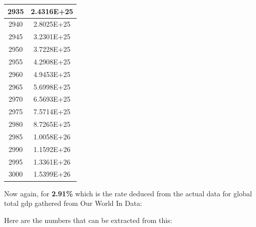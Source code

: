 \documentclass[a4paper]{article}
\begin{document}
\begin{tabular}{|c|c|}
		\hline
		2935 & 2.4316E+25 \\
		\hline
		2940 & 2.8025E+25 \\
		\hline
		2945 & 3.2301E+25 \\
		\hline
		2950 & 3.7228E+25 \\
		\hline
		2955 & 4.2908E+25 \\
		\hline
		2960 & 4.9453E+25 \\
		\hline
		2965 & 5.6998E+25 \\
		\hline
		2970 & 6.5693E+25 \\
		\hline
		2975 & 7.5714E+25 \\
		\hline
		2980 & 8.7265E+25 \\
		\hline
		2985 & 1.0058E+26 \\
		\hline
		2990 & 1.1592E+26 \\
		\hline
		2995 & 1.3361E+26 \\
		\hline
		3000 & 1.5399E+26 \\
		\hline
	\end{tabular}
	
	\normalsize
	
	\pagebreak
	
	Now again, for \textbf{2.91\%} which is the rate deduced from the actual data for global total gdp gathered from Our World In Data:
	
	\medskip
	
	
	Here are the numbers that can be extracted from this:
	
\end{document}
